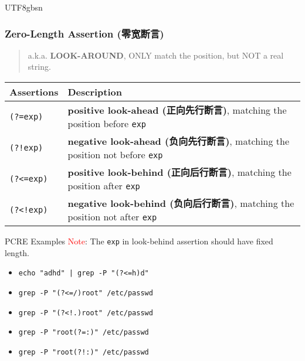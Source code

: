 \documentclass[red]{beamer}
\newcommand*{\lstverb}{\lstinline[style=caret]}
\begin{document}
\begin{CJK*}{UTF8}{gbsn}
\begin{frame}
\frametitle{Zero-Length Assertion (零宽断言)}
\begin{quote}
\scriptsize
a.k.a. \textbf{LOOK-AROUND}, ONLY match the position, but NOT a real string.
\end{quote}
\begin{table}[ht]
\scriptsize
\renewcommand\arraystretch{2.0}
\begin{tabular}{ll}
\hline
\textbf{Assertions} & \textbf{Description}\\
\hline
\lstverb|(?=exp)| & \textbf{positive look-ahead (正向先行断言)}, matching the position before \texttt{exp}\\
\lstverb|(?!exp)| & \textbf{negative look-ahead (负向先行断言)}, matching the position not before \texttt{exp}\\
\lstverb|(?<=exp)| & \textbf{positive look-behind (正向后行断言)}, matching the position after \texttt{exp}\\
\lstverb|(?<!exp)| & \textbf{negative look-behind (负向后行断言)}, matching the position not after \texttt{exp}\\
\hline
\end{tabular}
\end{table}
\begin{block}{\centering PCRE Examples}
\textcolor{red}{Note}: The \texttt{exp} in look-behind assertion should have fixed length.
\scriptsize
\begin{itemize}
	\item \lstverb{echo "adhd" | grep -P "(?<=h)d" }
	\item \lstverb|grep -P "(?<=/)root" /etc/passwd|
	\item \lstverb|grep -P "(?<!.)root" /etc/passwd|
	\item \lstverb|grep -P "root(?=:)" /etc/passwd|
	\item \lstverb|grep -P "root(?!:)" /etc/passwd|
\end{itemize}
\end{block}
\end{frame}


\end{CJK*}
\end{document}
